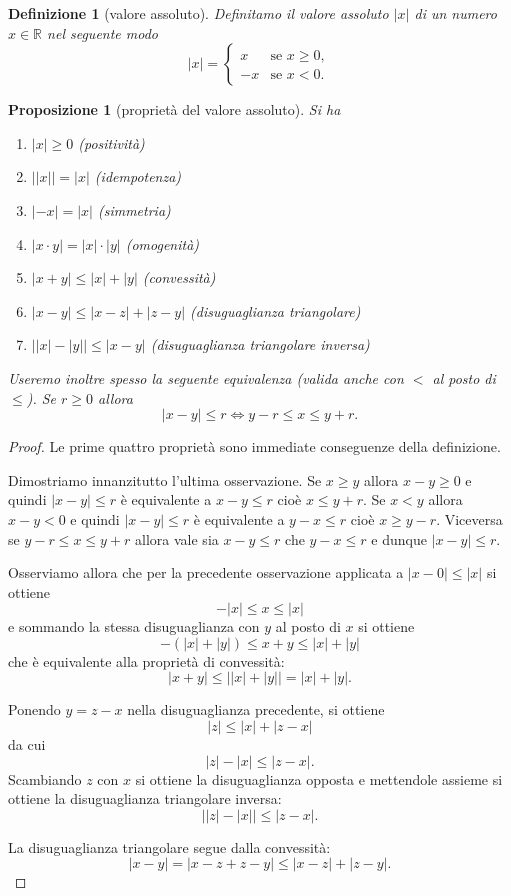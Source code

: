 \documentclass[italian,a4paper,oneside,headinclude]{scrbook}
\newcommand{\myemph}[1]{\emph{#1}\marginpar{#1}\index{#1}}
\newcommand{\RR}{\mathbb R}
\newcommand{\abs}[1]{{\left|#1\right|}}
\newtheorem{proposition}[theorem]{Proposizione}
\newtheorem{definition}[theorem]{Definizione}
\begin{document}
\begin{definition}[valore assoluto]
Definitamo il \myemph{valore assoluto} $\abs{x}$ di un numero $x\in \RR$ nel seguente modo
\[
\abs{x} =
\begin{cases}
  x & \text{se $x\ge 0$}, \\
  -x & \text{se $x<0 $}.
\end{cases}
\]
\end{definition}

\begin{proposition}[proprietà del valore assoluto]
Si ha
\begin{enumerate}
\item $\abs{x}\ge 0$ (positività)
\item $\big\lvert\abs{x}\big\rvert = \abs{x}$ (idempotenza)
\item $\abs{-x} = \abs{x}$ (simmetria)
\item $\abs{x\cdot y} = \abs{x}\cdot \abs{y}$ (omogenità)
\item $\abs{x+y} \le \abs{x} + \abs{y}$ (convessità)
\item $\abs{x-y} \le \abs{x-z} + \abs{z-y}$ (disuguaglianza triangolare)
\item $\big\lvert\abs{x}-\abs{y}\big\rvert \le \abs{x-y}$ (disuguaglianza triangolare inversa)
\end{enumerate}
Useremo inoltre spesso la seguente equivalenza (valida
anche con $<$ al posto di $\le$). Se $r\ge 0$ allora
\[
 \abs{x-y} \le r
 \iff
 y - r \le x \le y + r.
\]
\end{proposition}
%
\begin{proof}
Le prime quattro proprietà sono immediate conseguenze della definizione.

Dimostriamo innanzitutto l'ultima osservazione.
Se $x\ge y$ allora $x-y\ge 0$ e quindi $\abs{x-y} \le r$ è
equivalente a $x-y\le r$ cioè $x\le y+r$.
Se $x<y$ allora $x-y<0$ e quindi $\abs{x-y} \le r$ è
equivalente a $y-x \le r$ cioè $x\ge y-r$.
Viceversa se $y-r \le x \le y+r$ allora vale sia $x-y \le r$ che $y-x \le r$ e dunque $\abs{x-y}\le r$.

Osserviamo allora che per la precedente osservazione applicata
a $\abs{x-0} \le \abs{x}$ si ottiene
\[
  -\abs{x} \le x \le \abs{x}
\]
e sommando la stessa disuguaglianza con $y$ al posto di $x$ si
ottiene
\[
  -(\abs{x} + \abs{y}) \le x + y \le \abs{x} + \abs{y}
\]
che è equivalente alla proprietà di convessità:
\[
  \abs{x+y} \le \big\lvert\abs{x} + \abs{y}\big\rvert = \abs{x} + \abs{y}.
\]

Ponendo $y=z-x$ nella disuguaglianza precedente, si ottiene
\[
  \abs{z} \le \abs{x} + \abs{z-x}
\]
da cui
\[
  \abs{z} - \abs{x} \le \abs{z-x}.
\]
Scambiando $z$ con $x$ si ottiene la disuguaglianza opposta
e mettendole assieme si ottiene
la disuguaglianza triangolare inversa:
\[
\big\lvert \abs{z}-\abs{x} \big\rvert  \le \abs{z-x}.
\]

La disuguaglianza triangolare segue dalla convessità:
\[
 \abs{x-y} = \abs{x-z + z-y} \le \abs{x-z} + \abs{z-y}.
\]



\end{proof}
\end{document}
